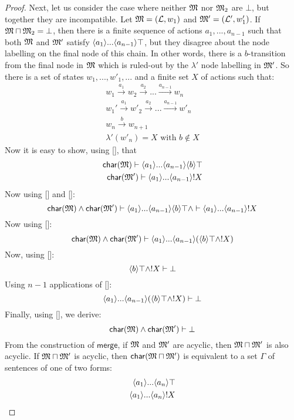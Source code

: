 \begin{proof}
Next, let us consider the case where neither $\frak{M}$ nor $\frak{M}_2$ are $\bot$, but together they are incompatible.
Let $\frak{M} = (\mathcal{L}, w_1)$ and $\frak{M}' = (\mathcal{L}', w'_1)$.
If $\frak{M} \sqcap \frak{M}_2 = \bot$, then there is a finite sequence of actions $a_1, ..., a_{n-1}$ such that both $\frak{M}$ and $\frak{M}'$ satisfy $\langle a_1 \rangle ... \langle a_{n-1} \rangle \top$, but they disagree about the node labelling on the final node of this chain. In other words, there is a $b$-transition from the final node in $\frak{M}$ which is ruled-out by the $\lambda'$ node labelling in $\frak{M}'$. So there is a set of states $w_1, ..., w'_1, ...$ and a finite set $X$ of actions such that:
\begin{eqnarray*}
w_1 \xrightarrow{a_1} w_2 \xrightarrow{a_2} ... \xrightarrow{a_{n-1}} w_n \\
w_1' \xrightarrow{a_1} w'_2 \xrightarrow{a_2} ... \xrightarrow{a_{n-1}} w'_n \\
w_n \xrightarrow{b} w_{n+1} \\
\lambda'(w'_n) = X \text{ with } b \notin X
\end{eqnarray*}
Now it is easy to show, using [], that
\begin{eqnarray*}
\mathsf{char}(\mathsf{\frak{M}}) \vdash \langle a_1 \rangle ... \langle a_{n-1} \rangle \langle b \rangle \top \\
\mathsf{char}(\mathsf{\frak{M}'}) \vdash \langle a_1 \rangle ... \langle a_{n-1} \rangle ! X
\end{eqnarray*}
Now using [] and []:
\[
\mathsf{char}(\mathsf{\frak{M}}) \land \mathsf{char}(\mathsf{\frak{M}}') \vdash  \langle a_1 \rangle ... \langle a_{n-1} \rangle \langle b \rangle \top \land  \vdash \langle a_1 \rangle ... \langle a_{n-1} \rangle ! X
\]
Now using []:
\[
\mathsf{char}(\mathsf{\frak{M}}) \land \mathsf{char}(\mathsf{\frak{M}}') \vdash  \langle a_1 \rangle ... \langle a_{n-1} \rangle (\langle b \rangle \top \land ! X)
\]
Now, using []:
\[
\langle b \rangle \top \land ! X \vdash \bot
\]
Using $n-1$ applications of  []:
\[
\langle a_1 \rangle ... \langle a_{n-1} \rangle (\langle b \rangle \top \land ! X) \vdash \bot
\]
Finally, using [], we derive:
\[
\mathsf{char}(\mathsf{\frak{M}}) \land \mathsf{char}(\mathsf{\frak{M}}') \vdash \bot
\]
 From the construction of
$\mathsf{merge}$, if $\frak{M}$ and $\frak{M}'$ are acyclic, then $\frak{M} \sqcap
\frak{M}'$ is also acyclic.  If $\frak{M} \sqcap \frak{M}'$ is acyclic, then
$\mathsf{char}(\frak{M} \sqcap \frak{M}')$ is equivalent to a set $\Gamma$ of
sentences of one of two forms:
\begin{eqnarray*}
\langle a_1 \rangle ... \langle a_n \rangle \top \\
\langle a_1 \rangle ... \langle a_n \rangle ! X
\end{eqnarray*}


\end{proof}
